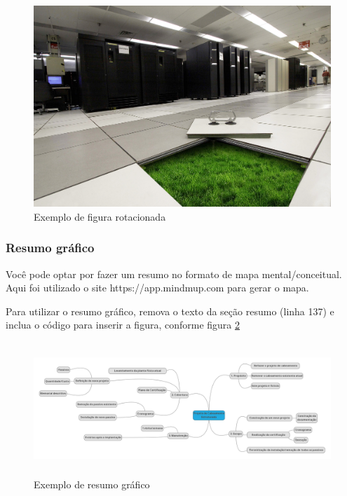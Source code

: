 \documentclass[	DIV=calc,%
							paper=a4,%
							fontsize=12pt,%
							onecolumn]{scrartcl}	 					%
\begin{document}
\begin{figure}
	\centering
	\includegraphics[height=\textwidth,angle=-90]{fig3}
	\caption{Exemplo de figura rotacionada}
	\label{fig3}
\end{figure}

\subsubsection{Resumo gráfico}

Você pode optar por fazer um resumo no formato de mapa mental/conceitual. 
Aqui foi utilizado o site https://app.mindmup.com para gerar o mapa.

Para utilizar o resumo gráfico, remova o texto da seção resumo (linha 137) e inclua o código para inserir a figura, conforme figura \ref{fig4}

\begin{figure}[h]
	\centering
	\includegraphics[width=\textwidth,height=5cm,keepaspectratio]{fig4}
	\caption{Exemplo de resumo gráfico}
	\label{fig4}	
\end{figure}

\end{document}

